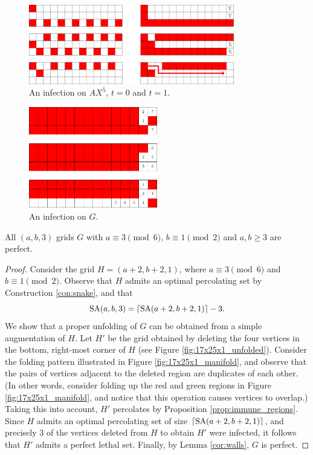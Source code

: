 \begin{figure}[]
\centering
\includegraphics[width=0.8\textwidth]{figures/7/3x13x3.pdf}
\caption{An infection on $AX^5$, $t=0$ and $t=1$.}
\label{fig:3x13x3}
\end{figure} 

\begin{figure}[]
\centering
\includegraphics[width=0.5\textwidth]{figures/7/3x14x3_numbered_heatmap.pdf}
\caption{An infection on $G$.}
\label{fig:3x14x3}
\end{figure} 

\begin{con}
\label{con:3xaxb}
All $(a,b,3)$ grids $G$ with $a \equiv 3 \pmod 6$, $b \equiv 1 \pmod 2$ and $a,b \geq 3$ are perfect. 
\end{con}

\begin{proof}
Consider the grid $H=(a+2,b+2,1)$, where $a \equiv 3 \pmod 6$ and $b \equiv 1 \pmod 2$. Observe that $H$ admits an optimal percolating set by Construction \ref{con:snake}, and that
$$\text{SA}(a,b,3) = \lceil\text{SA}(a+2,b+2,1)\rceil - 3.$$
We show that a proper unfolding of $G$ can be obtained from a simple augmentation of $H$. Let $H'$ be the grid obtained by deleting the four vertices in the bottom, right-most corner of $H$ (see Figure \ref{fig:17x25x1_unfolded}). Consider the folding pattern illustrated in Figure \ref{fig:17x25x1_manifold}, and observe that the pairs of vertices adjacent to the deleted region are duplicates of each other. (In other words, consider folding up the red and green regions in Figure \ref{fig:17x25x1_manifold}, and notice that this operation causes vertices to overlap.) Taking this into account, $H'$ percolates by Proposition \ref{prop:immune_regions}. Since $H$ admits an optimal percolating set of size $\lceil\text{SA}(a+2,b+2,1)\rceil$, and precisely 3 of the vertices deleted from $H$ to obtain $H'$ were infected, it follows that $H'$ admits a perfect lethal set. Finally, by Lemma \ref{cor:walls}, $G$ is perfect.
\end{proof}

